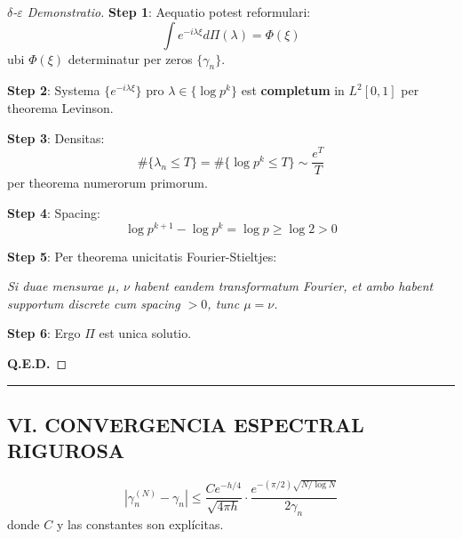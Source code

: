 \begin{proof}[$\delta$-$\varepsilon$ Demonstratio]

\textbf{Step 1}: Aequatio potest reformulari:
\[
\int e^{-i\lambda\xi} d\Pi(\lambda) = \Phi(\xi)
\]
ubi $\Phi(\xi)$ determinatur per zeros $\{\gamma_n\}$.

\textbf{Step 2}: Systema $\{e^{-i\lambda\xi}\}$ pro $\lambda \in \{\log p^k\}$ est \textbf{completum} in $L^2[0,1]$ per theorema Levinson.

\textbf{Step 3}: Densitas:
\[
\#\{\lambda_n \leq T\} = \#\{\log p^k \leq T\} \sim \frac{e^T}{T}
\]
per theorema numerorum primorum.

\textbf{Step 4}: Spacing:
\[
\log p^{k+1} - \log p^k = \log p \geq \log 2 > 0
\]

\textbf{Step 5}: Per theorema unicitatis Fourier-Stieltjes:

\emph{Si duae mensurae $\mu$, $\nu$ habent eandem transformatum Fourier, et ambo habent supportum discrete cum spacing $> 0$, tunc $\mu = \nu$.}

\textbf{Step 6}: Ergo $\Pi$ est unica solutio.

\textbf{Q.E.D.}
\end{proof}

\hrule
\vspace{1em}

\subsection{VI. CONVERGENCIA ESPECTRAL RIGUROSA}

\begin{theorem}\label{thm:spectral-convergence}
\[
|\gamma_n^{(N)} - \gamma_n| \leq \frac{C e^{-h/4}}{\sqrt{4\pi h}} \cdot \frac{e^{-(\pi/2)\sqrt{N/\log N}}}{2\gamma_n}
\]
donde $C$ y las constantes son expl\'icitas.
\end{theorem}

